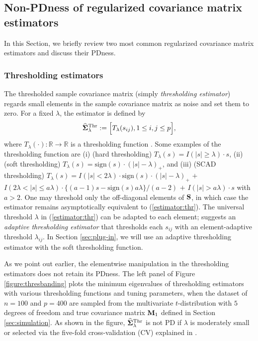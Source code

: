 \documentclass[times,sort&compress,3p]{elsarticle}
\newcommand{\MB}{\mathbb}
\newcommand{\sign}{\mathrm{sign}}
\begin{document}
\subsection{Non-PDness of regularized covariance matrix estimators}

In this Section, we briefly review two most common regularized covariance matrix estimators and
discuss their PDness.

\subsubsection{Thresholding estimators}
The thresholded sample covariance matrix (simply \emph{thresholding
 estimator}) regards small elements in the sample covariance matrix as noise and set them to zero. For a fixed
 $\lambda$, the estimator is defined by
\begin{equation}\label{estimator:thr}
\widehat{\bf \Sigma}_{\lambda}^{\rm Thr} := \Big[ T_{\lambda}(s_{ij}), 1 \le i,j \le p \Big],
\end{equation}
where $T_{\lambda}(\cdot) : \MB{R} \rightarrow \MB{R}$ is a thresholding function \citep{Rothman2009}.
Some examples of the thresholding function  are
(i) (hard thresholding) $T_{\lambda}(s) = I(|s| \geq \lambda) \cdot s$,
 (ii) (soft thresholding) $T_{\lambda}(s) = \sign(s) \cdot (|s| - \lambda)_+$, and (iii) (SCAD thresholding)
$T_{\lambda}(s) = I(|s| < 2\lambda)\cdot \sign(s) \cdot (|s| - \lambda)_+$  $+$
$I(2\lambda < |s| \leq a\lambda) \cdot \{(a - 1)s - \sign(s) a \lambda\} / (a - 2)$ $+$
$I(|s| > a\lambda)\cdot s$ with $a>2$.
One may threshold only the off-diagonal elements of $\bf S$, in which case the estimator remains asymptotically
equivalent to (\ref{estimator:thr}).
 The universal threshold $\lambda$  in (\ref{estimator:thr}) can be adapted to each element;
 \citet{Cai2011b} suggests an \emph{adaptive thresholding estimator} that thresholds each $s_{ij}$ with an
 element-adaptive threshold $\lambda_{ij}$. In Section \ref{sec:plug-in}, we will use an adaptive thresholding
 estimator with the soft thresholding function.
 
As we point out earlier, the elementwise manipulation in the thresholding estimators
does not retain its PDness.
The left panel of Figure \ref{figure:thresbanding} plots the minimum eigenvalues of thresholding
 estimators with various thresholding functions and tuning parameters, when the dataset of $n=100$ and $p=400$ are sampled from the multivariate $t$-distribution with $5$ degrees of freedom and true covariance matrix ${\bf M}_1$ defined in Section \ref{sec:simulation}.
As shown in
the figure, $\widehat{\bf \Sigma}_{\lambda}^{\rm Thr}$ is not PD if $\lambda$ is moderately small or selected via the five-fold cross-validation (CV) explained in \citet{Bickel2008a}.
\end{document}
